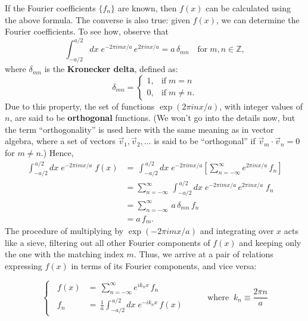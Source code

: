 \documentclass[10pt,a4paper]{article}
\begin{document}
If the Fourier coefficients $\{f_n\}$ are known, then $f(x)$ can be
calculated using the above formula. The converse is also true: given
$f(x)$, we can determine the Fourier coefficients. To see how, observe
that
\begin{equation}
\int_{-a/2}^{a/2} dx \; e^{-2\pi i m x/a}\, e^{2\pi i n x/a} = a\, \delta_{mn}\quad \mathrm{for}\;m, n \in \mathbb{Z},
\end{equation}
where $\delta_{mn}$ is the \textbf{Kronecker delta}, defined as:
\begin{equation}
\delta_{mn} = \left\{\begin{array}{ll}1, & \textrm{if}\; m = n\\ 0, & \mathrm{if}\;m\ne n.\end{array}\right.
\end{equation}
Due to this property, the set of functions $\exp(2\pi i n x / a)$,
with integer values of $n$, are said to be \textbf{orthogonal}
functions. (We won't go into the details now, but the term
``orthogonality'' is used here with the same meaning as in vector
algebra, where a set of vectors $\vec{v}_1, \vec{v}_2, \dots$ is said
to be ``orthogonal'' if $\vec{v}_m \cdot \vec{v}_n = 0$ for
$m\ne n$.) Hence,
\begin{align}
  \int_{-a/2}^{\,a/2} dx\; e^{-2\pi i m x/a} \;f(x)
  &= \, \int_{-a/2}^{\,a/2} dx\; e^{-2\pi i m x/a} \left[\sum_{n=-\infty}^\infty e^{2\pi i n x/a}\, f_n\right] \\
  &= \sum_{n=-\infty}^\infty \, \int_{-a/2}^{\,a/2} dx\; e^{-2\pi i m x/a}  \, e^{2\pi i n x/a} \;f_n \\
  &= \sum_{n=-\infty}^\infty \, a\, \delta_{mn} \, f_n \\
  &= a \,f_m.
\end{align}
The procedure of multiplying by $\exp(-2\pi i m x/a)$ and integrating
over $x$ acts like a sieve, filtering out all other Fourier components
of $f(x)$ and keeping only the one with the matching index $m$.
Thus, we arrive at a pair of relations expressing $f(x)$ in terms of
its Fourier components, and vice versa:

\begin{framed}
\begin{equation}
\left\{\;\;\begin{array}{rl}f(x) &= \displaystyle \, \sum_{n=-\infty}^\infty e^{i k_n x}\, f_n \\ f_n &= \displaystyle\,\frac{1}{a} \int_{-a/2}^{\,a/2} dx\; e^{-i k_n x}\, f(x)\end{array}\;\;\right. \quad\quad\mathrm{where}\;\; k_n \equiv \frac{2\pi n}{a}
\label{fseries-relations}
\end{equation}
\end{framed}
\end{document}
